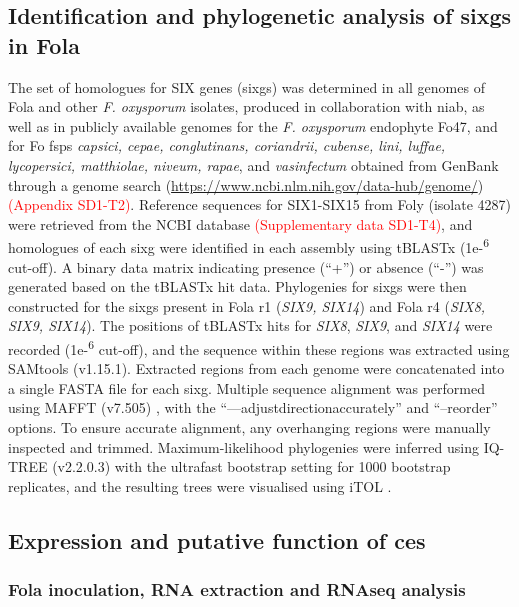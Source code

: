 \subsection{Identification and phylogenetic analysis of \aclp{sixg} in \acl{Fola}}

The set of homologues for SIX genes (\acp{sixg}) was determined in all genomes of \ac{Fola} and other \textit{F. oxysporum} isolates, produced in collaboration with \ac{niab}, as well as in publicly available genomes for the \textit{F. oxysporum} endophyte Fo47, and for \ac{Fo} \acp{fsp} \textit{capsici, cepae, conglutinans, coriandrii, cubense, lini, luffae, lycopersici, matthiolae, niveum, rapae}, and \textit{vasinfectum} obtained from GenBank through a genome search (\url{https://www.ncbi.nlm.nih.gov/data-hub/genome/}) \textcolor{red}{(Appendix SD1-T2)}. Reference sequences for SIX1-SIX15 from \ac{Foly} (isolate 4287) were retrieved from the NCBI database \textcolor{red}{(Supplementary data SD1-T4)}, and homologues of each \ac{sixg} were identified in each assembly using tBLASTx (1e-\textsuperscript{6} cut-off). A binary data matrix indicating presence (“+”) or absence (“-”) was generated based on the tBLASTx hit data. Phylogenies for \acp{sixg} were then constructed for the \acp{sixg} present in \ac{Fola} \ac{r1} (\textit{SIX9, SIX14}) and \ac{Fola} \ac{r4} (\textit{SIX8, SIX9, SIX14}). The positions of tBLASTx hits for \textit{SIX8}, \textit{SIX9}, and \textit{SIX14} were recorded (1e-\textsuperscript{6} cut-off), and the sequence within these regions was extracted using SAMtools (v1.15.1). Extracted regions from each genome were concatenated into a single FASTA file for each \ac{sixg}. Multiple sequence alignment was performed using MAFFT (v7.505) \parencite{Katoh2019}, with the “—adjustdirectionaccurately” and “–reorder” options. To ensure accurate alignment, any overhanging regions were manually inspected and trimmed. Maximum-likelihood phylogenies were inferred using IQ-TREE (v2.2.0.3) \parencite{Nguyen2015} with the ultrafast bootstrap setting for 1000 bootstrap replicates, and the resulting trees were visualised using iTOL \parencite{Letunic2021}.


\subsection{Expression and putative function of \acp{ce}}

\subsubsection{\Acf{Fola} inoculation, RNA extraction and RNAseq analysis}

